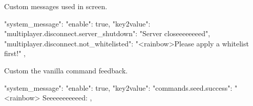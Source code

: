 \begin{example}{Custom messages used in screen.}
    \begin{json}
        "system_message": {
            "enable": true,
            "key2value": {
                "multiplayer.disconnect.server_shutdown": "Server closeeeeeeeed",
                "multiplayer.disconnect.not_whitelisted": "<rainbow>Please apply a whitelist first!"
            }
        },
    \end{json}
\end{example}

\begin{example}{Custom the vanilla command feedback.}
    \begin{json}
        "system_message": {
            "enable": true,
            "key2value": {
                "commands.seed.success": "<rainbow> Seeeeeeeeeeed: %
            }
        },
    \end{json}
\end{example}